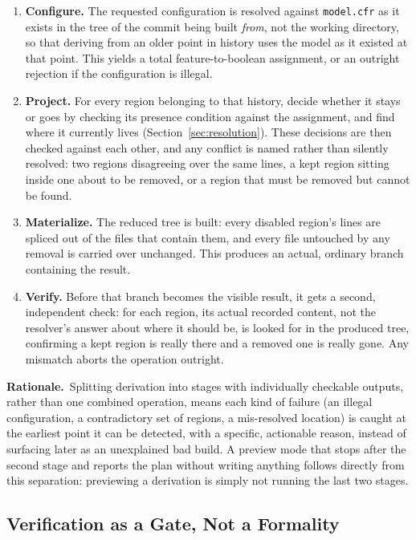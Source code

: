 \documentclass[11pt]{article}
\newcommand{\rationale}{\noindent\textbf{Rationale.}\ }
\begin{document}
\begin{enumerate}[leftmargin=1.6em]
  \item \textbf{Configure.} The requested configuration is resolved
    against \texttt{model.cfr} as it exists in the tree of the commit
    being built \emph{from}, not the working directory, so that
    deriving from an older point in history uses the model as it existed
    at that point. This yields a total feature-to-boolean assignment,
    or an outright rejection if the configuration is illegal.
    \item \textbf{Project.} For every region belonging to that history,
    decide whether it stays or goes by checking its presence condition
    against the assignment, and find where it currently lives
    (Section~\ref{sec:resolution}). These decisions are then checked
    against each other, and any conflict is named rather than silently
    resolved: two regions disagreeing over the same lines, a kept region
    sitting inside one about to be removed, or a region that must be
    removed but cannot be found.
  \item \textbf{Materialize.} The reduced tree is built: every disabled
    region's lines are spliced out of the files that contain them, and
    every file untouched by any removal is carried over unchanged. This
    produces an actual, ordinary branch containing the result.
  \item \textbf{Verify.} Before that branch becomes the visible result,
    it gets a second, independent check: for each region, its actual
    recorded content, not the resolver's answer about where it should
    be, is looked for in the produced tree, confirming a kept region is
    really there and a removed one is really gone. Any mismatch aborts
    the operation outright.
  \end{enumerate}

\rationale Splitting derivation into stages with individually checkable
outputs, rather than one combined operation, means each kind of failure
(an illegal configuration, a contradictory set of regions, a
mis-resolved location) is caught at the earliest point it can be
detected, with a specific, actionable reason, instead of surfacing later
as an unexplained bad build. A preview mode that stops after the second
stage and reports the plan without writing anything follows directly from
this separation: previewing a derivation is simply not running the last
two stages.

\subsection{Verification as a Gate, Not a Formality}
\end{document}
